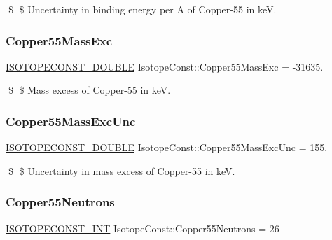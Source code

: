\$ \$ Uncertainty in binding energy per A of Copper-\/55 in keV. \mbox{\label{group___isotope_const-_copper-_cu55_gab08c42982edd3795cf26c14d7d4d62f2}} 
\subsubsection{\texorpdfstring{Copper55\+Mass\+Exc}{Copper55MassExc}}
{\footnotesize\ttfamily \mbox{\hyperlink{group___isotope_const-_macros_ga8f45a7272ce02c0b4c65c44636ed719a}{I\+S\+O\+T\+O\+P\+E\+C\+O\+N\+S\+T\+\_\+\+D\+O\+U\+B\+LE}} Isotope\+Const\+::\+Copper55\+Mass\+Exc = -\/31635.}

\$ \$ Mass excess of Copper-\/55 in keV. \mbox{\label{group___isotope_const-_copper-_cu55_ga394c4f881c821b24e146a426d59bb115}} 
\subsubsection{\texorpdfstring{Copper55\+Mass\+Exc\+Unc}{Copper55MassExcUnc}}
{\footnotesize\ttfamily \mbox{\hyperlink{group___isotope_const-_macros_ga8f45a7272ce02c0b4c65c44636ed719a}{I\+S\+O\+T\+O\+P\+E\+C\+O\+N\+S\+T\+\_\+\+D\+O\+U\+B\+LE}} Isotope\+Const\+::\+Copper55\+Mass\+Exc\+Unc = 155.}

\$ \$ Uncertainty in mass excess of Copper-\/55 in keV. \mbox{\label{group___isotope_const-_copper-_cu55_ga3ab22a691d1296513d7965a909a4c2dd}} 
\subsubsection{\texorpdfstring{Copper55\+Neutrons}{Copper55Neutrons}}
{\footnotesize\ttfamily \mbox{\hyperlink{group___isotope_const-_macros_ga5f18360b3e99483a35c32d789e62621c}{I\+S\+O\+T\+O\+P\+E\+C\+O\+N\+S\+T\+\_\+\+I\+NT}} Isotope\+Const\+::\+Copper55\+Neutrons = 26}

